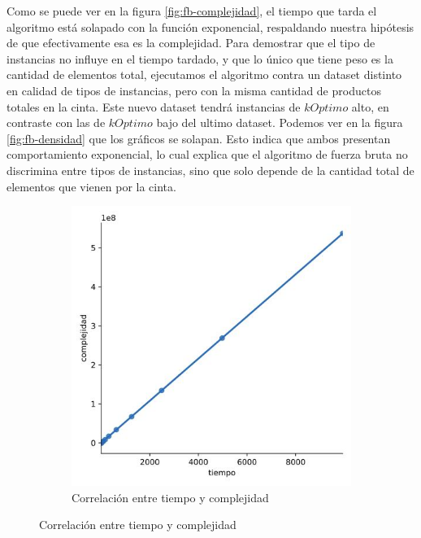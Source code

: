 \documentclass[10pt,a4paper]{article}
\begin{document}
Como se puede ver en la figura \ref{fig:fb-complejidad}, el tiempo que tarda el algoritmo está solapado con la función exponencial, respaldando nuestra hipótesis de que efectivamente esa es la complejidad.
\newline
Para demostrar que el tipo de instancias no influye en el tiempo tardado, y que lo único que tiene peso es la cantidad de elementos total, ejecutamos el algoritmo contra un dataset distinto en calidad de tipos de instancias, pero con la misma cantidad de productos totales en la cinta. Este nuevo dataset tendrá instancias de $kOptimo$ alto, en contraste con las de $kOptimo$ bajo del ultimo dataset.
\newline
\newline
Podemos ver en la figura \ref{fig:fb-densidad} que los gráficos se solapan. Esto indica que ambos presentan comportamiento exponencial, lo cual explica que el algoritmo de fuerza bruta no discrimina entre tipos de instancias, sino que solo depende de la cantidad total de elementos que vienen por la cinta.
\newline
\begin{figure}[h!]
	\centering
	\begin{subfigure}{0.4\linewidth}
		\centering
			\includegraphics[scale=0.3]{img/fb-correlacion.jpg}
			\caption{Correlación entre tiempo y complejidad}
			\label{fig:fb-correlacion}
	\end{subfigure}	
\end{figure}
\end{document}
